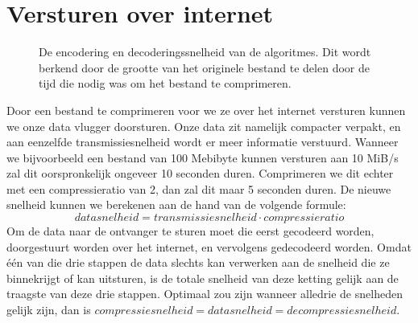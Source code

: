 \documentclass[a4paper]{article}
\begin{document}
\section{Versturen over internet}

\begin{figure}[H]
    \centering
\caption{De encodering en decoderingssnelheid van de algoritmes. Dit wordt berkend door de grootte van het originele bestand te delen door de tijd die nodig was om het bestand te comprimeren.}
\end{figure}


Door een bestand te comprimeren voor we ze over het internet versturen kunnen we onze data vlugger doorsturen. Onze data zit namelijk compacter verpakt, en aan eenzelfde transmissiesnelheid wordt er meer informatie verstuurd. Wanneer we bijvoorbeeld een bestand van 100 Mebibyte kunnen versturen aan 10 MiB/s zal dit oorspronkelijk ongeveer 10 seconden duren. Comprimeren we dit echter met een compressieratio van 2, dan zal dit maar 5 seconden duren. De nieuwe snelheid kunnen we berekenen aan de hand van de volgende formule:
$$ datasnelheid = transmissiesnelheid\cdot compressieratio $$
Om de data naar de ontvanger te sturen moet die eerst gecodeerd worden, doorgestuurt worden over het internet, en vervolgens gedecodeerd worden. Omdat één van die drie stappen de data slechts kan verwerken aan de snelheid die ze binnekrijgt of kan uitsturen, is de totale snelheid van deze ketting gelijk aan de traagste van deze drie stappen. Optimaal zou zijn wanneer alledrie de snelheden gelijk zijn, dan is $ compressiesnelheid = datasnelheid = decompressiesnelheid $.
\end{document}
